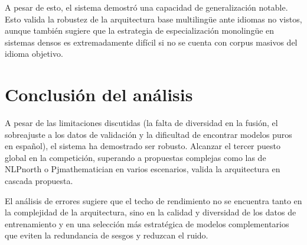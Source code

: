 A pesar de esto, el sistema demostró una capacidad de generalización notable. Esto valida la robustez de la arquitectura base multilingüe ante idiomas no vistos, aunque también sugiere que la estrategia de especialización monolingüe en sistemas densos es extremadamente difícil si no se cuenta con corpus masivos del idioma objetivo.

\section{Conclusión del análisis}

\noindent A pesar de las limitaciones discutidas (la falta de diversidad en la fusión, el sobreajuste a los datos de validación y la dificultad de encontrar modelos puros en español), el sistema ha demostrado ser robusto. Alcanzar el tercer puesto global en la competición, superando a propuestas complejas como las de NLPnorth \cite{zhang2025nlpnorth} o Pjmathematician \cite{vachharajani2025pjmathematician} en varios escenarios, valida la arquitectura en cascada propuesta.

El análisis de errores sugiere que el techo de rendimiento no se encuentra tanto en la complejidad de la arquitectura, sino en la calidad y diversidad de los datos de entrenamiento y en una selección más estratégica de modelos complementarios que eviten la redundancia de sesgos y reduzcan el ruido.